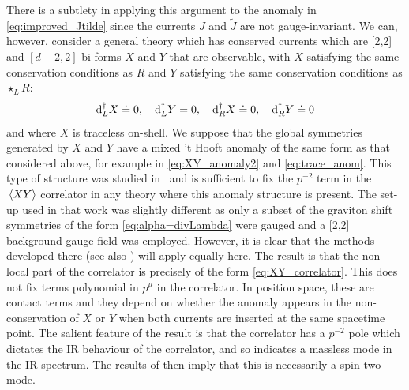 There is a subtlety in applying this argument to the anomaly in \eqref{eq:improved_Jtilde} since the currents $J$ and $\tilde{J}$ are not gauge-invariant. 
We can, however, consider a general theory which has conserved currents which are [2,2] and $[d-2,2]$ bi-forms $X$ and $Y$ that are observable, with $X$ satisfying the same conservation conditions as $R$ and $Y$ satisfying the same conservation conditions as $\star_L R$:
\begin{equation}\label{eq:XY_conservation}
    \dd_L^\dag X \doteq 0\qc \dd_L^\dag Y = 0\qc \dd_R^\dag X \doteq 0\qc \dd_R^\dag Y \doteq 0
\end{equation}
and where $X$ is traceless on-shell.
We suppose that the global symmetries generated by $X$ and $Y$ have a mixed 't Hooft anomaly of the same form as that considered above, for example in \eqref{eq:XY_anomaly2} and \eqref{eq:trace_anom}.
This type of structure was studied in~\cite{Hinterbichler2023GravitySymmetries} and is sufficient to fix the $p^{-2}$ term in the $\ev*{X Y}$ correlator in any theory where this anomaly structure is present.
The set-up used in that work was slightly different as only a subset of the graviton shift symmetries of the form \eqref{eq:alpha=divLambda} were gauged and a [2,2] background gauge field was employed. However, it is clear that the methods developed there (see also \cite{Delacretaz:2019brr}) will apply equally here.
The result is that the non-local part of the correlator is precisely of the form \eqref{eq:XY_correlator}. This does not fix terms polynomial in $p^\mu$ in the correlator. In position space, these are contact terms and they depend on whether the anomaly appears in the non-conservation of $X$ or $Y$ when both currents are inserted at the same spacetime point.
The salient feature of the result is that the correlator has a $p^{-2}$ pole which dictates the IR behaviour of the correlator, and so indicates a massless mode in the IR spectrum. The results of \cite{Weinberg:2020nsn, Distler:2020fzr} then imply that this is necessarily a spin-two mode. 

